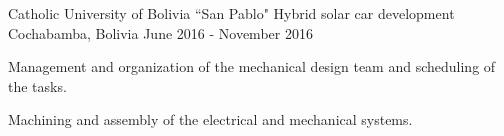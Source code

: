 

\begin{cventries}

  \cventry
    {Catholic University of Bolivia ``San Pablo"} %
    {Hybrid solar car development} %
    {Cochabamba, Bolivia} %
    {June 2016 - November 2016} %
    {
      \begin{cvitems} %
        \item {Management and organization of the mechanical design team and scheduling of the tasks.}
        \item {Machining and assembly of the electrical and mechanical systems.}
      \end{cvitems}
    }

\end{cventries}
